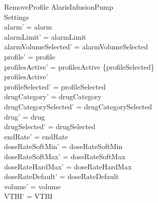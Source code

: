 \begin{schema}{RemoveProfile}
	\Delta AlarisInfusionPump\\
	 Settings\\
	\where
	alarm' = alarm\\
	alarmLimit' = alarmLimit\\
	alarmVolumeSelected' = alarmVolumeSelected\\
	profile' = profile\\
	profilesActive' = profilesActive \setminus \{profileSelected\}\\
	profilesActive' \neq \emptyset\\
	profileSelected' = profileSelected\\
	drugCategory' = drugCategory\\ 
	drugCategorySelected' = drugCategorySelected\\
	\pagebreak
	drug' = drug\\ 
	drugSelected' = drugSelected\\
	endRate' = endRate\\
	doseRateSoftMin' = doseRateSoftMin\\
	doseRateSoftMax' = doseRateSoftMax\\
	doseRateHardMax' = doseRateHardMax\\
	doseRateDefault' = doseRateDefault\\
	volume' = volume\\
	VTBI' = VTBI\\

\end{schema}
